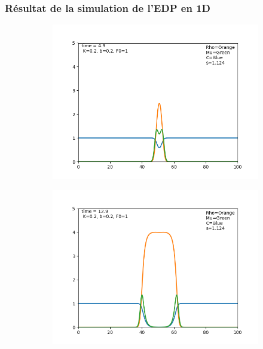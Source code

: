 \subsubsection{Résultat de la simulation de l'EDP en 1D}
\begin{figure}[hbt!]
\centering
\begin{subfigure}[b]{0.45\textwidth}
\includegraphics[width=\textwidth]{Images/edp_1d_0.png}
\end{subfigure}
\begin{subfigure}[b]{0.45\textwidth}
\includegraphics[width=\textwidth]{Images/edp_1d_1.png}
\end{subfigure}
\begin{subfigure}[b]{0.45\textwidth}

\end{subfigure}
\end{figure}
